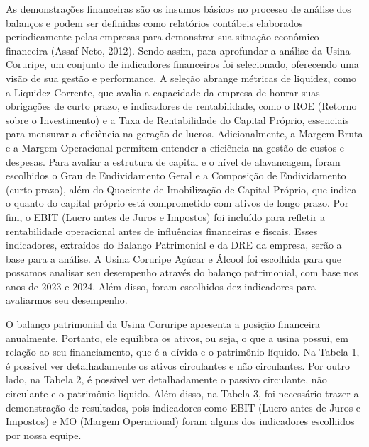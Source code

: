 \documentclass[1pt,a4paper]{article}
\begin{document}
	As demonstrações financeiras são os insumos básicos no processo de análise dos balanços e podem ser definidas como relatórios contábeis elaborados periodicamente pelas empresas para demonstrar sua situação econômico-financeira (Assaf Neto, 2012). Sendo assim, para aprofundar a análise da Usina Coruripe, um conjunto de indicadores financeiros foi selecionado, oferecendo uma visão de sua gestão e performance. A seleção abrange métricas de liquidez, como a Liquidez Corrente, que avalia a capacidade da empresa de honrar suas obrigações de curto prazo, e indicadores de rentabilidade, como o ROE (Retorno sobre o Investimento) e a Taxa de Rentabilidade do Capital Próprio, essenciais para mensurar a eficiência na geração de lucros. Adicionalmente, a Margem Bruta e a Margem Operacional permitem entender a eficiência na gestão de custos e despesas. Para avaliar a estrutura de capital e o nível de alavancagem, foram escolhidos o Grau de Endividamento Geral e a Composição de Endividamento (curto prazo), além do Quociente de Imobilização de Capital Próprio, que indica o quanto do capital próprio está comprometido com ativos de longo prazo. Por fim, o EBIT (Lucro antes de Juros e Impostos) foi incluído para refletir a rentabilidade operacional antes de influências financeiras e fiscais. Esses indicadores, extraídos do Balanço Patrimonial e da DRE da empresa, serão a base para a análise. A Usina Coruripe Açúcar e Álcool foi escolhida para que possamos analisar seu desempenho através do balanço patrimonial, com base nos anos de 2023 e 2024. Além disso, foram escolhidos dez indicadores para avaliarmos seu desempenho.
	
	O balanço patrimonial da Usina Coruripe apresenta a posição financeira anualmente. Portanto, ele equilibra os ativos, ou seja, o que a usina possui, em relação ao seu financiamento, que é a dívida e o patrimônio líquido. Na Tabela 1, é possível ver detalhadamente os ativos circulantes e não circulantes. Por outro lado, na Tabela 2, é possível ver detalhadamente o passivo circulante, não circulante e o patrimônio líquido. Além disso, na Tabela 3, foi necessário trazer a demonstração de resultados, pois indicadores como EBIT (Lucro antes de Juros e Impostos) e MO (Margem Operacional) foram alguns dos indicadores escolhidos por nossa equipe.
	
\end{document}
